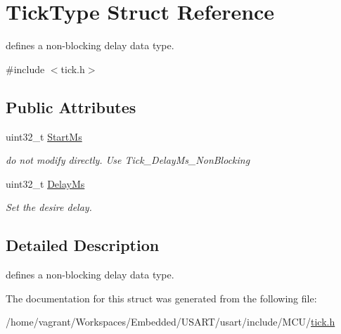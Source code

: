 \hypertarget{struct_tick_type}{\section{Tick\+Type Struct Reference}
\label{struct_tick_type}
}


defines a non-\/blocking delay data type.  




{\ttfamily \#include $<$tick.\+h$>$}

\subsection*{Public Attributes}
\begin{DoxyCompactItemize}
\item 
\hypertarget{struct_tick_type_ab5d0b8e09de5ccc9e44a9b261916bdd2}{uint32\+\_\+t \hyperlink{struct_tick_type_ab5d0b8e09de5ccc9e44a9b261916bdd2}{Start\+Ms}}\label{struct_tick_type_ab5d0b8e09de5ccc9e44a9b261916bdd2}

\begin{DoxyCompactList}\small\item\em do not modify directly. Use Tick\+\_\+\+Delay\+Ms\+\_\+\+Non\+Blocking \end{DoxyCompactList}\item 
\hypertarget{struct_tick_type_ae24ecd63a2b008c5c9a6864cbb3b30a7}{uint32\+\_\+t \hyperlink{struct_tick_type_ae24ecd63a2b008c5c9a6864cbb3b30a7}{Delay\+Ms}}\label{struct_tick_type_ae24ecd63a2b008c5c9a6864cbb3b30a7}

\begin{DoxyCompactList}\small\item\em Set the desire delay. \end{DoxyCompactList}\end{DoxyCompactItemize}


\subsection{Detailed Description}
defines a non-\/blocking delay data type. 

The documentation for this struct was generated from the following file\+:\begin{DoxyCompactItemize}
\item 
/home/vagrant/\+Workspaces/\+Embedded/\+U\+S\+A\+R\+T/usart/include/\+M\+C\+U/\hyperlink{tick_8h}{tick.\+h}\end{DoxyCompactItemize}
